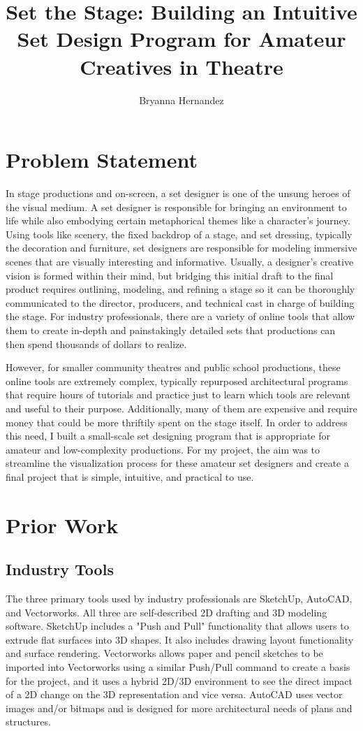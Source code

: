 \documentclass[10pt,twocolumn]{article}
\title{Set the Stage: Building an Intuitive Set Design Program for Amateur Creatives in Theatre}
\author{Bryanna Hernandez}
\affiliation{Occidental College}
\begin{document}
\maketitle

\section{Problem Statement}
In stage productions and on-screen, a set designer is one of the unsung heroes of the visual medium. A set designer is responsible for bringing an environment to life while also embodying certain metaphorical themes like a character's journey. Using tools like scenery, the fixed backdrop of a stage, and set dressing, typically the decoration and furniture, set designers are responsible for modeling immersive scenes that are visually interesting and informative. Usually, a designer's creative vision is formed within their mind, but bridging this initial draft to the final product requires outlining, modeling, and refining a stage so it can be thoroughly communicated to the director, producers, and technical cast in charge of building the stage. For industry professionals, there are a variety of online tools that allow them to create in-depth and painstakingly detailed sets that productions can then spend thousands of dollars to realize. 

However, for smaller community theatres and public school productions, these online tools are extremely complex, typically repurposed architectural programs that require hours of tutorials and practice just to learn which tools are relevant and useful to their purpose. Additionally, many of them are expensive and require money that could be more thriftily spent on the stage itself. In order to address this need, I built a small-scale set designing program that is appropriate for amateur and low-complexity productions. For my project, the aim was to streamline the visualization process for these amateur set designers and create a final project that is simple, intuitive, and practical to use.

\section{Prior Work}
\subsection{Industry Tools}
The three primary tools used by industry professionals are SketchUp, AutoCAD, and Vectorworks. All three are self-described 2D drafting and 3D modeling software. SketchUp includes a "Push and Pull" functionality that allows users to extrude flat surfaces into 3D shapes. It also includes drawing layout functionality and surface rendering. Vectorworks allows paper and pencil sketches to be imported into Vectorworks using a similar Push/Pull command to create a basis for the project, and it uses a hybrid 2D/3D environment to see the direct impact of a 2D change on the 3D representation and vice versa. AutoCAD uses vector images and/or bitmaps and is designed for more architectural needs of plans and structures. 
\end{document}
